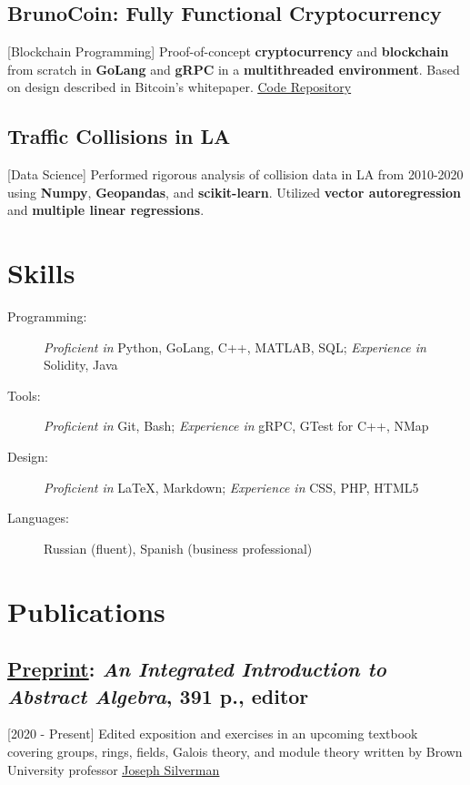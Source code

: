 \documentclass{mycv}
\begin{document}
\subsection{BrunoCoin: Fully Functional Cryptocurrency}[Blockchain Programming]
Proof-of-concept \textbf{cryptocurrency} and \textbf{blockchain} from scratch in \textbf{GoLang} and \textbf{gRPC} in a \textbf{multithreaded environment}. Based on design described in Bitcoin's whitepaper. \href{https://github.com/alizma/BrunoCoin}{\underline{Code Repository}}

\subsection{Traffic Collisions in LA}[Data Science]
Performed rigorous analysis of collision data in LA from 2010-2020 using \textbf{Numpy}, \textbf{Geopandas}, and \textbf{scikit-learn}. Utilized \textbf{vector autoregression} and \textbf{multiple linear regressions}.



\section{Skills}

\begin{description}
  \item[Programming:] \textit{Proficient in} Python, GoLang, C++, MATLAB, SQL; \textit{Experience in} Solidity, Java
  \item[Tools:] \textit{Proficient in} Git, Bash; \textit{Experience in} gRPC, GTest for C++, NMap 
  \item[Design:] \textit{Proficient in} \LaTeX, Markdown; \textit{Experience in} CSS, PHP, HTML5 
  \item[Languages:] Russian (fluent), Spanish (business professional) 

\end{description}


\section{Publications}
\subsection{\underline{Preprint}: \textit{An Integrated Introduction to Abstract Algebra}, 391 p., editor}[2020 - Present] 
Edited exposition and exercises in an upcoming textbook covering groups, rings, fields, Galois theory, and module theory written by Brown University professor \href{http://www.math.brown.edu/johsilve/}{\underline{Joseph Silverman}}
\end{document}
